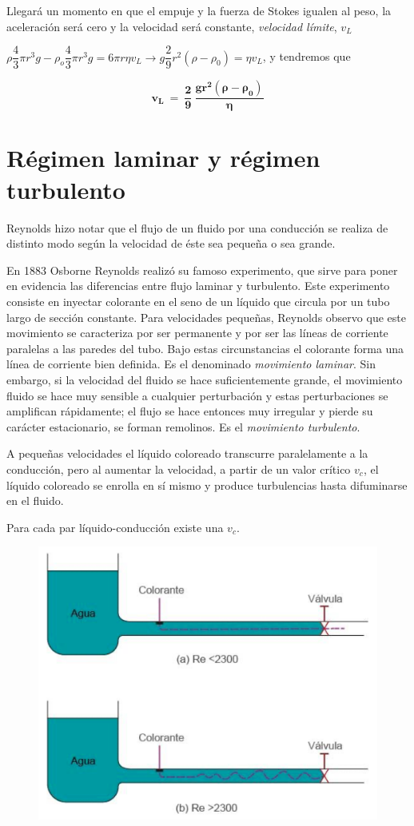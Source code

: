 Llegará un momento en que el empuje y la fuerza de Stokes igualen al peso, la aceleración será cero y la velocidad será constante, \emph{velocidad límite}, $v_L$

$\rho \dfrac 4 3 \pi r^3 g - \rho_o \dfrac 4 3 \pi r^3 g = 6 \pi r \eta v_L \to g 	\dfrac 2 9 r^2 (\rho - \rho_0)=\eta v_L$, y tendremos que

$$ \boldsymbol{v_L \ = \ \dfrac 2 9 \ \dfrac{g r^2 (\rho-\rho_0)}{\eta}} $$

\vspace{10mm} %
\section{Régimen laminar y régimen turbulento}

Reynolds hizo notar que el flujo de un fluido por una conducción se realiza de distinto modo según la velocidad de éste sea pequeña o sea grande.

En 1883 Osborne Reynolds realizó su famoso experimento, que sirve para poner en evidencia las diferencias entre flujo laminar y turbulento. Este experimento consiste en inyectar colorante en el seno de un líquido que circula por un tubo largo de sección constante. Para velocidades pequeñas, Reynolds observo que este movimiento se caracteriza por ser permanente y por ser las líneas de corriente paralelas a las paredes del tubo. Bajo estas circunstancias el colorante forma una línea de corriente bien definida. Es el denominado \emph{movimiento laminar}. Sin embargo, si la velocidad del fluido se hace suficientemente grande, el movimiento fluido se hace muy sensible a cualquier perturbación y estas perturbaciones se amplifican rápidamente; el flujo se hace entonces muy irregular y pierde su carácter estacionario, se forman remolinos. Es el \emph{movimiento turbulento}. 

\begin{multicols}{2}
A pequeñas velocidades el líquido coloreado transcurre paralelamente a la conducción, pero al aumentar la velocidad, a partir de un valor crítico $v_c$, el líquido coloreado se enrolla en sí mismo y produce turbulencias hasta difuminarse en el fluido.

Para cada par líquido-conducción existe una $v_c$.
\begin{figure}[H]
	\centering
	\includegraphics[width=.5\textwidth]{imagenes/imagenes18/T18IM12.png}
	\end{figure}
\end{multicols}


